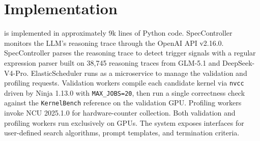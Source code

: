 \section{Implementation}\label{subsec:impl}

\sysname{} is implemented in approximately 9k lines of Python code.
SpecController monitors the LLM's reasoning trace through the OpenAI API v2.16.0.
SpecController parses the reasoning trace to detect trigger signals with a regular expression parser built on 38{,}745 reasoning traces from GLM-5.1 and DeepSeek-V4-Pro.
ElasticScheduler runs as a microservice to manage the validation and profiling requests.
Validation workers compile each candidate kernel via \texttt{nvcc} driven by Ninja 1.13.0 with \texttt{MAX\_JOBS=20}, then run a single correctness check against the \texttt{KernelBench} reference on the validation GPU.
Profiling workers invoke NCU 2025.1.0 for hardware-counter collection. Both validation and profiling workers run exclusively on GPUs.
The system exposes interfaces for user-defined search algorithms, prompt templates, and termination criteria.